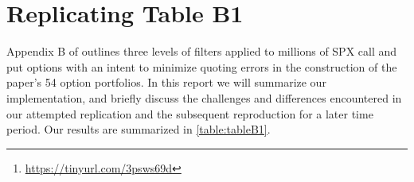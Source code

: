 \begin{titlepage}

% 
\maketitle


\doublespacing
\begin{abstract}
In this report we summarize our efforts to replicate the data filtration process described in Appendix B of \textit{The Puzzle of Index Option Returns} by \citet{constantinides2013}. These filters shape the underlying distribution of implied volatility (``IV'') and moneyness for a large cross-section of SPX index options (1 million+), and were used to build and price 54 option portfolios in the original paper. Due to the unavailability of SPX option data from 1985 to 1995, we focus our analysis on replicating the filtration results OptionMetrics data from \STARTONE\  to \ENDONE. We then apply these filters to more recent data from \STARTTWO\  to \ENDTWO. Through a sequence of data visualizations, we show that while the paper's intricately constructed data filters may yield elegant results when applied to one time period, these results do not necessarily port over to other time periods. The implications for option pricing models based on such time-fragile data filters would be an interesting follow-up study. Our detailed analysis and code can be readily found on \href{https://tinyurl.com/3psws69d}{Github}\footnote{ \url{https://tinyurl.com/3psws69d}}.  


\end{abstract}


\end{titlepage}

\doublespacing


\section{Replicating Table B1}

Appendix B of \citet{constantinides2013} outlines three levels of filters applied to millions of SPX call and put options with an intent to minimize quoting errors in the construction of the paper's 54 option portfolios. In this report we will summarize our implementation, and briefly discuss the challenges and differences encountered in our attempted replication and the subsequent reproduction for a later time period. Our results are summarized in \autoref{table:tableB1}. 

